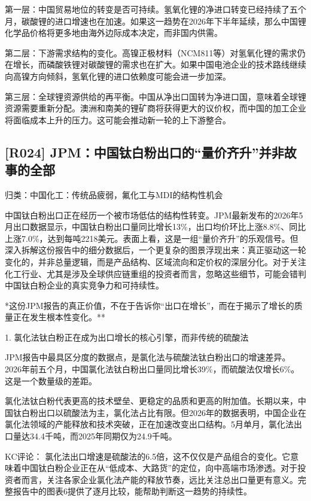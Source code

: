 \documentclass[11pt]{ctexart}
\begin{document}
第一层：中国贸易地位的转变是否可持续。氢氧化锂的净进口转变已经持续了五个月，碳酸锂的进口增速也在加速。如果这一趋势在2026年下半年延续，那么中国锂化学品价格将更多地由海外边际成本决定，而非国内供需。

第二层：下游需求结构的变化。高镍正极材料（NCM811等）对氢氧化锂的需求仍在增长，而磷酸铁锂对碳酸锂的需求也在扩大。如果中国电池企业的技术路线继续向高镍方向倾斜，氢氧化锂的进口依赖度可能会进一步加深。

第三层：全球锂资源供给的再平衡。中国从净出口国转为净进口国，意味着全球锂资源需要重新分配。澳洲和南美的锂矿商将获得更大的议价权，而中国的加工企业将面临成本上升的压力。这可能会推动新一轮的上下游整合。

\subsection{[R024] JPM：中国钛白粉出口的“量价齐升”并非故事的全部}
{\small\color{refgray}归类：中国化工：传统品疲弱，氟化工与MDI的结构性机会}

中国钛白粉出口正在经历一个被市场低估的结构性转变。JPM最新发布的2026年5月出口数据显示，中国钛白粉出口量同比增长13\%，出口均价环比上涨8.8\%、同比上涨7.0\%，达到每吨2218美元。表面上看，这是一组“量价齐升”的乐观信号。但深入拆解这份报告中的细分数据后，一个更复杂的图景浮现出来：真正驱动这一轮变化的，并非总量逻辑，而是产品结构、区域流向和定价权的深层分化。对于关注化工行业、尤其是涉及全球供应链重组的投资者而言，忽略这些细节，可能会错判中国钛白粉企业的真实竞争力和可持续性。

*这份JPM报告的真正价值，不在于告诉你“出口在增长”，而在于揭示了增长的质量正在发生根本性变化。**

1. 氯化法钛白粉正在成为出口增长的核心引擎，而非传统的硫酸法

JPM报告中最具区分度的数据点，是氯化法与硫酸法钛白粉出口的增速差异。2026年前五个月，中国氯化法钛白粉出口量同比增长39\%，而硫酸法仅增长6\%。这是一个数量级的差距。

氯化法钛白粉代表更高的技术壁垒、更稳定的品质和更高的附加值。长期以来，中国钛白粉出口以硫酸法为主，氯化法占比有限。但2026年的数据表明，中国企业在氯化法领域的产能释放和技术突破，正在加速改变出口结构。5月单月，氯化法出口量达34.4千吨，而2025年同期仅为24.9千吨。

KC评论： 氯化法出口增速是硫酸法的6.5倍，这不仅仅是产品组合的变化。它意味着中国钛白粉企业正在从“低成本、大路货”的定位，向中高端市场渗透。对于投资者而言，关注各家企业氯化法产能的释放节奏，远比关注总出口量更有意义。完整报告中的图表6提供了逐月比较，能帮助判断这一趋势的持续性。
\end{document}
